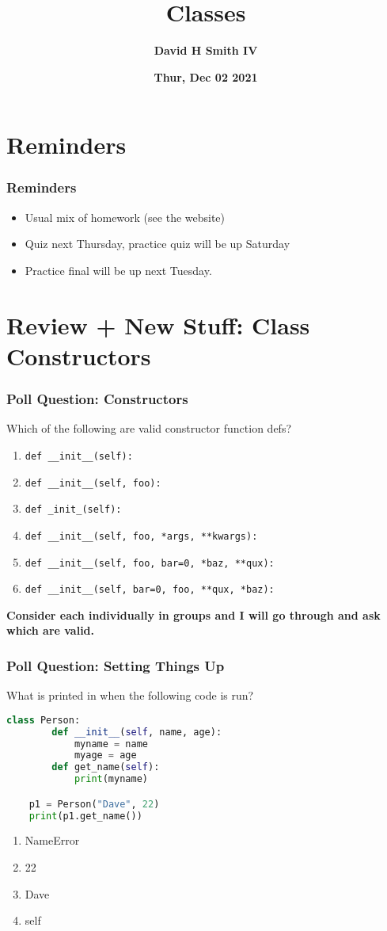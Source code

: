 \documentclass{beamer}
\title{\textbf{Classes}}
\author{\textbf{David H Smith IV}}
\institute[\textbf{UIUC}]{\textbf{University of Illinois Urbana-Champaign}}
\date{\textbf{Thur, Dec 02 2021}}
\begin{document}
\frame{\titlepage}

\section{Reminders}

%
%
\begin{frame}
    \frametitle{Reminders}
    \begin{itemize}
        \item Usual mix of homework (see the website)
        \item Quiz next Thursday, practice quiz will be up Saturday
        \item Practice final will be up next Tuesday.
    \end{itemize}
\end{frame}


\section{Review + New Stuff: Class Constructors}

%
%
\begin{frame}[fragile]
    \frametitle{Poll Question: Constructors}
    Which of the following are valid constructor function defs?
    \begin{enumerate}
        \item \lstinline|def __init__(self):|
        \item \lstinline|def __init__(self, foo):|
        \item \lstinline|def _init_(self):|
        \item \lstinline|def __init__(self, foo, *args, **kwargs):|
        \item \lstinline|def __init__(self, foo, bar=0, *baz, **qux):|
        \item \lstinline|def __init__(self, bar=0, foo, **qux, *baz):|
    \end{enumerate}
    \vfill
    \textbf{Consider each individually in groups and I will go through and ask which are valid.}
\end{frame}

%
%
\begin{frame}[fragile]
    \frametitle{Poll Question: Setting Things Up}
    What is printed in when the following code is run?
    \begin{lstlisting}[language=Python, autogobble]
    class Person:
        def __init__(self, name, age):
            myname = name
            myage = age
        def get_name(self):
            print(myname)

    p1 = Person("Dave", 22)
    print(p1.get_name())
    \end{lstlisting}
    \vfill
    \begin{enumerate}[A]
        \item NameError
        \item 22
        \item Dave
        \item self
    \end{enumerate}
\end{frame}
\end{document}
